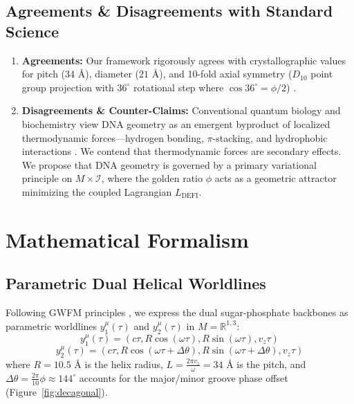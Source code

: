\documentclass[11pt,a4paper]{article}
\begin{document}
\subsection{Agreements \& Disagreements with Standard Science}
\begin{enumerate}
    \item \textbf{Agreements:} Our framework rigorously agrees with crystallographic values for pitch ($34\text{ \AA}$), diameter ($21\text{ \AA}$), and 10-fold axial symmetry ($D_{10}$ point group projection with $36^\circ$ rotational step where $\cos 36^\circ = \phi/2$) \cite{saenger1984}.
    \item \textbf{Disagreements \& Counter-Claims:} Conventional quantum biology and biochemistry view DNA geometry as an emergent byproduct of localized thermodynamic forces—hydrogen bonding, $\pi$-stacking, and hydrophobic interactions \cite{zwanenburg2020}. We contend that thermodynamic forces are secondary effects. We propose that DNA geometry is governed by a primary variational principle on $M \times \mathcal{I}$, where the golden ratio $\phi$ acts as a geometric attractor minimizing the coupled Lagrangian $L_{\text{DEFI}}$.
\end{enumerate}

\section{Mathematical Formalism}

\subsection{Parametric Dual Helical Worldlines}
Following GWFM principles \cite{dutton2026gwfm}, we express the dual sugar-phosphate backbones as parametric worldlines $y_1^\mu(\tau)$ and $y_2^\mu(\tau)$ in $M = \mathbb{R}^{1,3}$:
\begin{equation}
    y_1^\mu(\tau) = \left( c\tau, R \cos(\omega \tau), R \sin(\omega \tau), v_z \tau \right)
\end{equation}
\begin{equation}
    y_2^\mu(\tau) = \left( c\tau, R \cos(\omega \tau + \Delta \theta), R \sin(\omega \tau + \Delta \theta), v_z \tau \right)
\end{equation}
where $R = 10.5\text{ \AA}$ is the helix radius, $L = \frac{2\pi v_z}{\omega} = 34\text{ \AA}$ is the pitch, and $\Delta \theta = \frac{2\pi}{10}\phi \approx 144^\circ$ accounts for the major/minor groove phase offset (Figure~\ref{fig:decagonal}).
\end{document}
